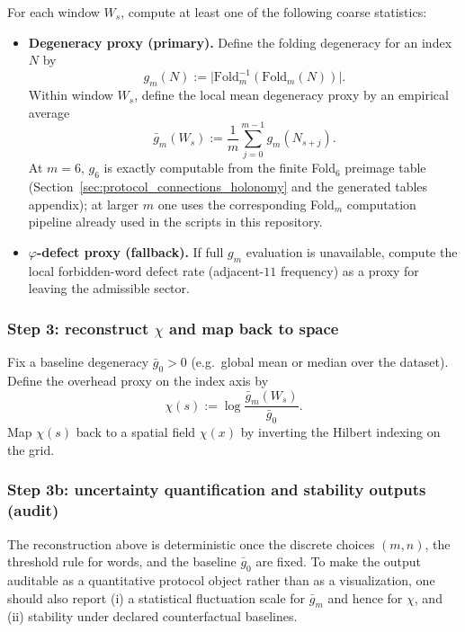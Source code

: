 For each window $W_s$, compute at least one of the following coarse statistics:
\begin{itemize}
\item \textbf{Degeneracy proxy (primary).}
Define the folding degeneracy for an index $N$ by
\[
g_m(N):=\bigl|\mathrm{Fold}_m^{-1}(\mathrm{Fold}_m(N))\bigr|.
\]
Within window $W_s$, define the local mean degeneracy proxy by an empirical average
\[
\bar g_m(W_s):=\frac{1}{m}\sum_{j=0}^{m-1} g_m(N_{s+j}).
\]
At $m=6$, $g_6$ is exactly computable from the finite Fold$_6$ preimage table (Section~\ref{sec:protocol_connections_holonomy} and the generated tables appendix); at larger $m$ one uses the corresponding Fold$_m$ computation pipeline already used in the scripts in this repository.
\item \textbf{$\varphi$-defect proxy (fallback).}
If full $g_m$ evaluation is unavailable, compute the local forbidden-word defect rate (adjacent-$11$ frequency) as a proxy for leaving the admissible sector.
\end{itemize}

\subsubsection{Step 3: reconstruct \texorpdfstring{$\chi$}{chi} and map back to space}
\label{subsec:chi_step3_reconstruct}

Fix a baseline degeneracy $\bar g_0>0$ (e.g.\ global mean or median over the dataset).
Define the overhead proxy on the index axis by
\begin{equation}
\label{eq:chi_reconstruct_def}
\chi(s):=\log\frac{\bar g_m(W_s)}{\bar g_0}.
\end{equation}
Map $\chi(s)$ back to a spatial field $\chi(x)$ by inverting the Hilbert indexing on the grid.

\subsubsection{Step 3b: uncertainty quantification and stability outputs (audit)}
\label{subsec:chi_step3b_uncertainty}

The reconstruction above is deterministic once the discrete choices $(m,n)$, the threshold rule for words, and the baseline $\bar g_0$ are fixed.
To make the output auditable as a quantitative protocol object rather than as a visualization, one should also report (i) a statistical fluctuation scale for $\bar g_m$ and hence for $\chi$, and (ii) stability under declared counterfactual baselines.


